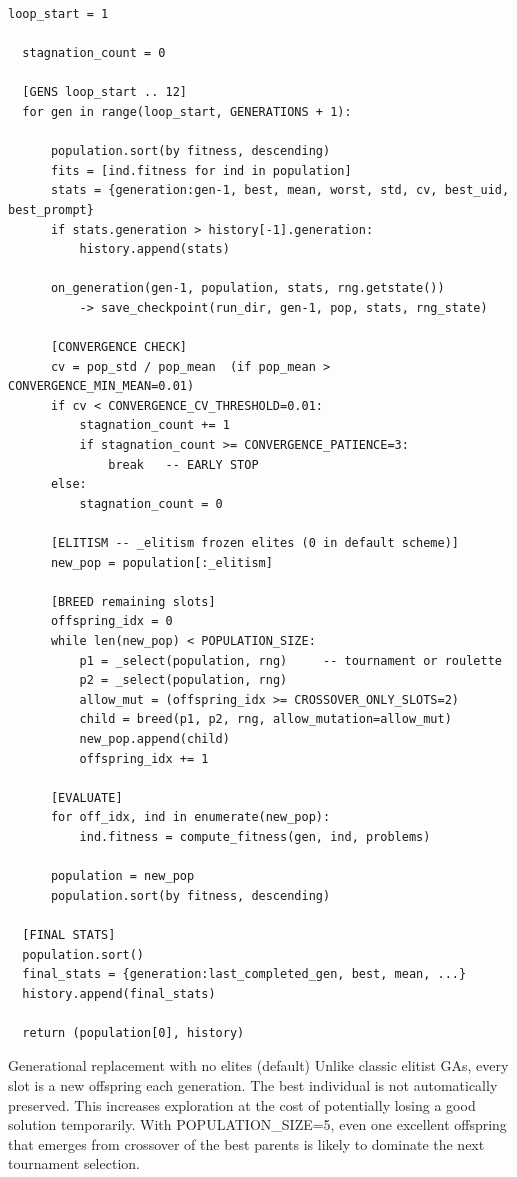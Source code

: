 \documentclass[11pt,a4paper]{report}
\begin{document}
\begin{lstlisting}[style=chain]
      loop_start = 1

  stagnation_count = 0

  [GENS loop_start .. 12]
  for gen in range(loop_start, GENERATIONS + 1):

      population.sort(by fitness, descending)
      fits = [ind.fitness for ind in population]
      stats = {generation:gen-1, best, mean, worst, std, cv, best_uid, best_prompt}
      if stats.generation > history[-1].generation:
          history.append(stats)

      on_generation(gen-1, population, stats, rng.getstate())
          -> save_checkpoint(run_dir, gen-1, pop, stats, rng_state)

      [CONVERGENCE CHECK]
      cv = pop_std / pop_mean  (if pop_mean > CONVERGENCE_MIN_MEAN=0.01)
      if cv < CONVERGENCE_CV_THRESHOLD=0.01:
          stagnation_count += 1
          if stagnation_count >= CONVERGENCE_PATIENCE=3:
              break   -- EARLY STOP
      else:
          stagnation_count = 0

      [ELITISM -- _elitism frozen elites (0 in default scheme)]
      new_pop = population[:_elitism]

      [BREED remaining slots]
      offspring_idx = 0
      while len(new_pop) < POPULATION_SIZE:
          p1 = _select(population, rng)     -- tournament or roulette
          p2 = _select(population, rng)
          allow_mut = (offspring_idx >= CROSSOVER_ONLY_SLOTS=2)
          child = breed(p1, p2, rng, allow_mutation=allow_mut)
          new_pop.append(child)
          offspring_idx += 1

      [EVALUATE]
      for off_idx, ind in enumerate(new_pop):
          ind.fitness = compute_fitness(gen, ind, problems)

      population = new_pop
      population.sort(by fitness, descending)

  [FINAL STATS]
  population.sort()
  final_stats = {generation:last_completed_gen, best, mean, ...}
  history.append(final_stats)

  return (population[0], history)
\end{lstlisting}

\begin{conceptbox}{Generational replacement with no elites (default)}
Unlike classic elitist GAs, every slot is a new offspring each generation.
The best individual is not automatically preserved.  This increases exploration
at the cost of potentially losing a good solution temporarily.  With POPULATION\_SIZE=5,
even one excellent offspring that emerges from crossover of the best parents is likely
to dominate the next tournament selection.
\end{conceptbox}
\end{document}
